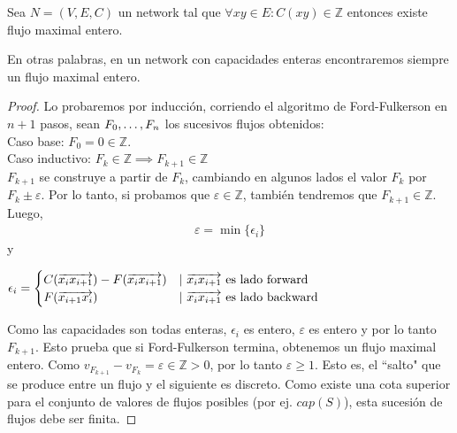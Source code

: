 \begin{theorem}\label{integrality}
  Sea $N=(V,E,C)$ un network tal que $\forall xy \in E : C(xy) \in \mathbb{Z}$ entonces existe flujo maximal entero.
  
  En otras palabras, en un network con capacidades enteras encontraremos siempre un flujo maximal entero.
\end{theorem}

\begin{proof}
  Lo probaremos por inducción, corriendo el algoritmo de Ford-Fulkerson en $n+1$ pasos, sean $F_0, \mathellipsis, F_n$ los sucesivos flujos obtenidos:\\
  Caso base: $F_0 = 0 \in \mathbb{Z}$.\\
  Caso inductivo:
  $F_k \in \mathbb{Z} \implies F_{k+1} \in \mathbb{Z}$\\
  $F_{k+1}$ se construye a partir de $F_k$, cambiando en algunos lados el valor $F_k$ por $F_k \pm \varepsilon$. Por lo tanto, si probamos que $\varepsilon \in \mathbb{Z}$, también tendremos que $F_{k+1} \in \mathbb{Z}$. Luego,
  \begin{align}
    \varepsilon = \min\{\epsilon_i\}
  \end{align}
  y \begin{center}
    $\epsilon_i = \begin{cases} 
        C(\overrightarrow{x_i x_{i+1}}) - F(\overrightarrow{x_i x_{i+1}}) & |\ \overrightarrow{x_i x_{i+1}} \text{ es lado forward}\\
        F(\overrightarrow{x_{i+1} x_i}) & |\ \overrightarrow{x_i x_{i+1}} \text{ es lado backward}
    \end{cases}$
  \end{center}
  Como las capacidades son todas enteras, $\epsilon_i$ es entero, $\varepsilon$  es entero y por lo tanto $F_{k+1}$.
  Esto prueba que si Ford-Fulkerson termina, obtenemos un flujo maximal entero.
  Como $v_{F_{k+1}} - v_{F_k} = \varepsilon \in \mathbb{Z} > 0$, por lo tanto $\varepsilon \ge 1$. Esto es, el ``salto" que se produce entre un flujo y el siguiente es discreto.
  Como existe una cota superior para el conjunto de valores de flujos posibles (por ej. $cap(S)$), esta sucesión de flujos debe ser finita. 
\end{proof}

